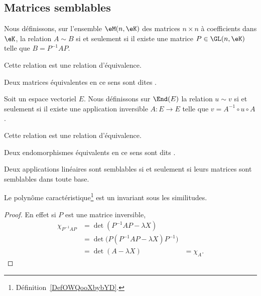 \subsection{Matrices semblables}

\begin{propositionDef} \label{DefCQNFooSDhDpB}
    Nous définissons, sur l'ensemble \( \eM(n,\eK)\) des matrices \( n\times n\) à coefficients dans \(\eK\), la relation  \( A\sim B\) si et seulement si il existe une matrice \( P\in\GL(n,\eK)\) telle que \( B=P^{-1}AP\). 

    Cette relation est une relation d'équivalence.

    Deux matrices équivalentes en ce sens sont dites .
\end{propositionDef}

\begin{propositionDef}      \label{PROPooIXFSooZsFWHm}
    Soit un espace vectoriel \( E\). Nous définissons sur \( \End(E)\) la relation \( u\sim v\) si et seulement si il existe une application inversible \( A\colon E\to E\) telle que \( v=A^{-1}\circ u\circ A\).

    Cette relation est une relation d'équivalence.

    Deux endomorphismes équivalents en ce sens sont dits .
\end{propositionDef}

\begin{proposition}     \label{PROPooBGJBooXlDYEv}
    Deux applications linéaires sont semblables si et seulement si leurs matrices sont semblables dans toute base.
\end{proposition}

\begin{lemma}
Le polynôme caractéristique\footnote{Définition~\ref{DefOWQooXbybYD}.} est un invariant sous les similitudes. 
\end{lemma}

\begin{proof}
En effet si \( P\) est une matrice inversible,
\begin{subequations}
    \begin{align}
        \chi_{P^{-1}AP} & = \det(P^{-1}AP-\lambda X)                     \\
                        & = \det\big( P(P^{-1}AP-\lambda X)P^{-1} \big)  \\
                        & = \det(A-\lambda X)
                        & = \chi_A.
    \end{align}
\end{subequations}
\end{proof}

